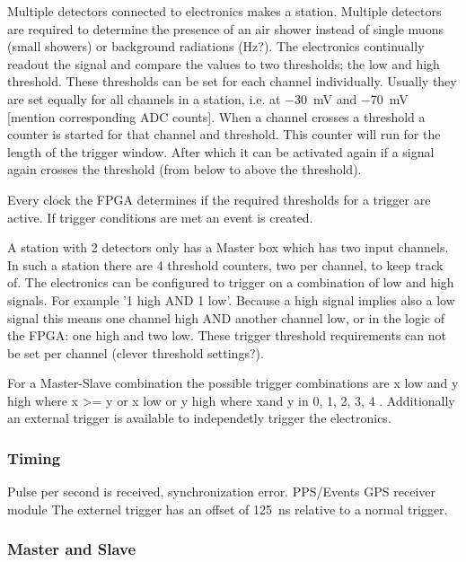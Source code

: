 Multiple detectors connected to \hisparc electronics makes a station. Multiple detectors are required to determine the presence of an air shower instead of single muons (small showers) or background radiations (Hz?). The \hisparc electronics continually readout the signal and compare the \adc values to two thresholds; the low and high threshold. These thresholds can be set for each channel individually. Usually they are set equally for all channels in a station, i.e. at \SI{-30}{\milli\volt} and \SI{-70}{\milli\volt} [mention corresponding ADC counts]. When a channel crosses a threshold a counter is started for that channel and threshold. This counter will run for the length of the trigger window. After which it can be activated again if a signal again crosses the threshold (from below to above the threshold).

Every clock the FPGA determines if the required thresholds for a trigger are active. If trigger conditions are met an event is created.

A station with 2 detectors only has a Master box which has two input channels. In such a station there are 4 threshold counters, two per channel, to keep track of. The electronics can be configured to trigger on a combination of low and high signals. For example '1 high AND 1 low'. Because a high signal implies also a low signal this means one channel high AND another channel low, or in the logic of the FPGA: one high and two low. These trigger threshold requirements can not be set per channel (clever threshold settings?).

For a Master-Slave combination the possible trigger combinations are x low and y high where x >= y or x low or y high where xand y in 0, 1, 2, 3, 4 . Additionally an external trigger is available to independetly trigger the electronics.

\subsubsection{Timing}

Pulse per second is received, synchronization error.
PPS/Events
GPS receiver module \cite{trimble}
The externel trigger has an offset of \SI{125}{\ns} relative to a normal trigger.


\subsubsection{Master and Slave}
\label{sub:masterslave}

